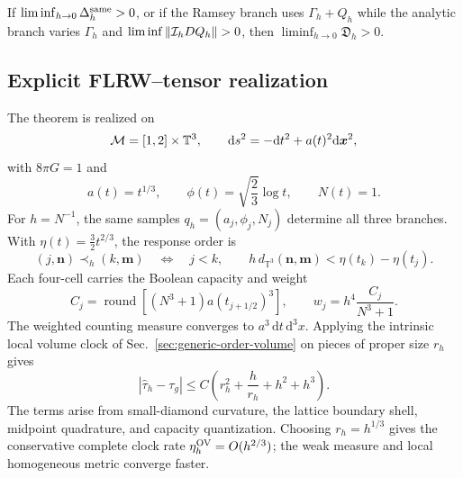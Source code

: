 \begin{corollary}
\label{cor:unified-split-rejection}
If \(\liminf_{h\to0}\Delta_h^{\rm same}>0\), or if the Ramsey branch uses
\(\Gamma_h+Q_h\) while the analytic branch varies \(\Gamma_h\) and
\(\liminf\|{\cal I}_hDQ_h\|>0\), then
\(\liminf_{h\to0}{\mathfrak D}_h>0\).
\end{corollary}

\subsection{Explicit FLRW--tensor realization}

The theorem is realized on
\begin{equation}
 {\cal M}=[1,2]\times\mathbb T^3,\qquad
 \mathrm ds^2=-\mathrm dt^2+a(t)^2\mathrm d\bm x^2 ,
 \label{eq:unified-flrw-metric}
\end{equation}
with \(8\pi G=1\) and
\begin{equation}
 a(t)=t^{1/3},\qquad
 \phi(t)=\sqrt{\frac23}\log t,\qquad
 N(t)=1 .
 \label{eq:unified-flrw-solution}
\end{equation}
For \(h=N^{-1}\), the same samples
\(q_h=(a_j,\phi_j,N_j)\) determine all three branches.  With
\(\eta(t)=\tfrac32t^{2/3}\), the response order is
\begin{equation}
 (j,\bm n)\prec_h(k,\bm m)
 \quad\Longleftrightarrow\quad
 j<k,\qquad
 h\,d_{\mathbb T^3}(\bm n,\bm m)
 <\eta(t_k)-\eta(t_j).
 \label{eq:unified-flrw-order}
\end{equation}
Each four-cell carries the Boolean capacity and weight
\begin{equation}
 C_j=\operatorname{round}\!\left[(N^3+1)a(t_{j+1/2})^3\right],
 \qquad
 w_j=h^4\frac{C_j}{N^3+1}.
 \label{eq:unified-capacity}
\end{equation}
The weighted counting measure converges to
\(a^3\,\mathrm dt\,\mathrm d^3x\).  Applying the intrinsic local
volume clock of Sec.~\ref{sec:generic-order-volume} on pieces of proper size
\(r_h\) gives
\begin{equation}
 |\widehat\tau_h-\tau_g|
 \le C\left(r_h^2+\frac{h}{r_h}+h^2+h^3\right).
 \label{eq:unified-order-volume-rate}
\end{equation}
The terms arise from small-diamond curvature, the lattice boundary shell,
midpoint quadrature, and capacity quantization.  Choosing
\(r_h=h^{1/3}\) gives the conservative complete clock rate
\(\eta_h^{\rm OV}=O(h^{2/3})\); the weak measure and local homogeneous metric
converge faster.

